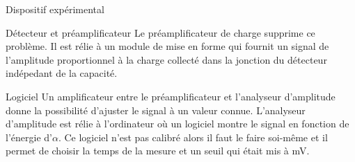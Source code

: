 \documentclass[a4paper,11pt]{scrartcl}
\begin{document}
\begin{section}{Dispositif expérimental}
\begin{subsection}{Détecteur et préamplificateur}
    Le préamplificateur de charge supprime ce problème. Il est rélie à un module de mise en forme qui fournit un signal de l'amplitude proportionnel à la charge collecté dans la jonction du détecteur indépedant de la capacité.
   \end{subsection}

   \begin{subsection}{Logiciel}
    Un amplificateur entre le préamplificateur et l'analyseur d'amplitude donne la possibilité d'ajuster le signal à un valeur connue. L'analyseur d'amplitude est rélie à l'ordinateur où un logiciel montre le signal en fonction de l'énergie d'$\alpha$. Ce logiciel n'est pas calibré alors il faut le faire soi-même et il permet de choisir la temps de la mesure et un seuil qui était mis à \unit[200]{mV}.
   \end{subsection}
  \end{section}
  
\end{document}
